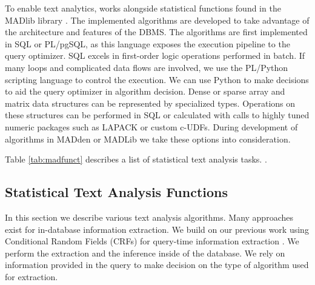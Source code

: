 






To enable text analytics, {\system} works alongside statistical
functions found in the MADlib library \cite{Cohen:2009:MSN:1687553.1687576}.
The implemented algorithms are developed to take advantage of the 
architecture and features of the DBMS.
The algorithms are first implemented in SQL or PL/pgSQL, as this language
exposes the execution pipeline to the query optimizer. 
SQL excels in first-order logic operations performed in batch.
If many loops and complicated data flows are involved, we use the PL/Python 
scripting language to control the execution.
We can use Python to make decisions to aid the query optimizer in algorithm
decision.
Dense or sparse array and matrix data structures can be represented
by specialized types. Operations on these structures can be performed in
SQL or calculated with calls to highly tuned numeric packages such as LAPACK
or custom c-UDFs.
During development of algorithms in MADden or MADLib we take these options 
into consideration.

Table \ref{tab:madfunct} describes a list of statistical text 
analysis tasks.
{\system}.


\subsection{Statistical Text Analysis Functions}

In this section we describe various text analysis algorithms.
Many approaches exist for in-database information extraction. 
We build on our previous work using Conditional Random Fields (CRFs) for 
query-time information extraction \cite{wang2011hybrid}.
We perform the extraction and the inference inside of the database. 
We rely on information
provided in the query to make decision on the type of algorithm used 
for extraction. 

